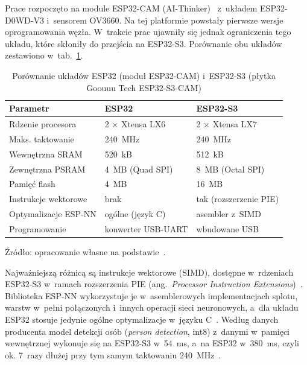 Prace rozpoczęto na module ESP32-CAM (AI-Thinker)~\cite{aithinker_esp32cam}
z~układem ESP32-D0WD-V3 i~sensorem OV3660. Na tej platformie powstały
pierwsze wersje oprogramowania węzła. W~trakcie prac ujawniły się jednak
ograniczenia tego układu, które skłoniły do przejścia na ESP32-S3.
Porównanie obu układów zestawiono w~tab.~\ref{tab:esp32-vs-s3}.

\begin{table}[htbp]
  \centering
  \caption{Porównanie układów ESP32 (moduł ESP32-CAM) i~ESP32-S3
    (płytka Goouuu Tech ESP32-S3-CAM)}
  \label{tab:esp32-vs-s3}
  \begin{tabular}{lll}
    \toprule
    Parametr & ESP32 & ESP32-S3 \\
    \midrule
    Rdzenie procesora    & 2 $\times$ Xtensa LX6 & 2 $\times$ Xtensa LX7 \\
    Maks. taktowanie     & 240~MHz               & 240~MHz \\
    Wewnętrzna SRAM      & 520~kB                & 512~kB \\
    Zewnętrzna PSRAM     & 4~MB (Quad SPI)       & 8~MB (Octal SPI) \\
    Pamięć flash         & 4~MB                  & 16~MB \\
    Instrukcje wektorowe & brak                  & tak (rozszerzenie PIE) \\
    Optymalizacje ESP-NN & ogólne (język C)      & asembler z~SIMD \\
    Programowanie        & konwerter USB-UART    & wbudowane USB \\
    \bottomrule
  \end{tabular}

  \vspace{2pt}
  {\footnotesize Źródło: opracowanie własne na
  podstawie~\cite{espressif_esp32_ds,espressif_esp32s3_ds,espressif_esp32s3_wroom1,aithinker_esp32cam,espressif_espnn}.}
\end{table}

Najważniejszą różnicą są instrukcje wektorowe (SIMD), dostępne
w~rdzeniach ESP32-S3 w~ramach rozszerzenia PIE (ang.~\textit{Processor
Instruction Extensions})~\cite{espressif_esp32s3_trm,espressif_pie_blog}.
Biblioteka ESP-NN wykorzystuje je w~asemblerowych implementacjach
splotu, warstw w~pełni połączonych i~innych operacji sieci neuronowych,
a~dla układu ESP32 stosuje jedynie ogólne optymalizacje w~języku
C~\cite{espressif_espnn}. Według danych producenta model detekcji osób
(\textit{person detection}, int8) z~danymi w~pamięci wewnętrznej
wykonuje się na ESP32-S3 w~54~ms, a~na ESP32 w~380~ms, czyli ok.
7~razy dłużej przy tym samym taktowaniu 240~MHz~\cite{espressif_espnn}.

